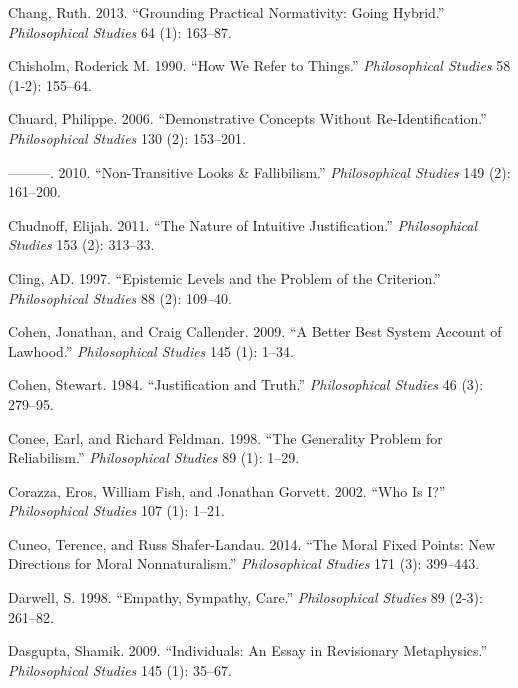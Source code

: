 \documentclass[
  10pt,
  letterpaper,
  DIV=11,
  numbers=noendperiod,
  twoside]{scrartcl}
\newlength{\cslhangindent}
\newenvironment{CSLReferences}[2] %
 {\begin{list}{}{%
  \setlength{\itemindent}{0pt}
  \setlength{\leftmargin}{0pt}
  \setlength{\parsep}{0pt}
  \ifodd #1
   \setlength{\leftmargin}{\cslhangindent}
   \setlength{\itemindent}{-1\cslhangindent}
  \fi
  \setlength{\itemsep}{#2\baselineskip}}}
 {\end{list}}
\begin{document}
\begin{CSLReferences}{1}{0}
Chang, Ruth. 2013. {``Grounding Practical Normativity: Going Hybrid.''}
\emph{Philosophical Studies} 64 (1): 163--87.

Chisholm, Roderick M. 1990. {``How We Refer to Things.''}
\emph{Philosophical Studies} 58 (1-2): 155--64.

Chuard, Philippe. 2006. {``Demonstrative Concepts Without
Re-Identification.''} \emph{Philosophical Studies} 130 (2): 153--201.

---------. 2010. {``Non-Transitive Looks \& Fallibilism.''}
\emph{Philosophical Studies} 149 (2): 161--200.

Chudnoff, Elijah. 2011. {``The Nature of Intuitive Justification.''}
\emph{Philosophical Studies} 153 (2): 313--33.

Cling, AD. 1997. {``Epistemic Levels and the Problem of the
Criterion.''} \emph{Philosophical Studies} 88 (2): 109--40.

Cohen, Jonathan, and Craig Callender. 2009. {``A Better Best System
Account of Lawhood.''} \emph{Philosophical Studies} 145 (1): 1--34.

Cohen, Stewart. 1984. {``Justification and Truth.''} \emph{Philosophical
Studies} 46 (3): 279--95.

Conee, Earl, and Richard Feldman. 1998. {``The Generality Problem for
Reliabilism.''} \emph{Philosophical Studies} 89 (1): 1--29.

Corazza, Eros, William Fish, and Jonathan Gorvett. 2002. {``Who Is
{I}?''} \emph{Philosophical Studies} 107 (1): 1--21.

Cuneo, Terence, and Russ Shafer-Landau. 2014. {``The Moral Fixed Points:
New Directions for Moral Nonnaturalism.''} \emph{Philosophical Studies}
171 (3): 399--443.

Darwell, S. 1998. {``Empathy, Sympathy, Care.''} \emph{Philosophical
Studies} 89 (2-3): 261--82.

Dasgupta, Shamik. 2009. {``Individuals: An Essay in Revisionary
Metaphysics.''} \emph{Philosophical Studies} 145 (1): 35--67.


\end{CSLReferences}
\end{document}
